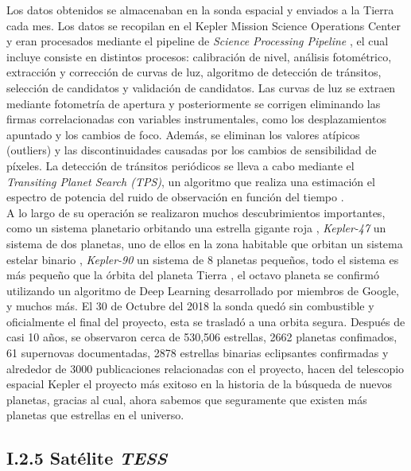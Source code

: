 Los datos obtenidos se almacenaban en la sonda espacial y enviados a la Tierra cada mes. Los datos se recopilan en el Kepler Mission Science Operations Center y eran procesados mediante el pipeline de \textit{Science Processing Pipeline} \cite{jenkins2010overview}, el cual incluye consiste en distintos procesos: calibración de nivel, análisis fotométrico, extracción y corrección de curvas de luz, algoritmo de detección de tránsitos, selección de candidatos y validación de candidatos. Las curvas de luz se extraen mediante fotometría de apertura y posteriormente se corrigen eliminando las firmas correlacionadas con variables instrumentales, como los desplazamientos apuntado y los cambios de foco.
Además, se eliminan los valores atípicos (outliers) y las discontinuidades causadas por los cambios de sensibilidad de píxeles. La detección de tránsitos periódicos se lleva a cabo mediante el \textit{Transiting Planet Search (TPS)}, un algoritmo que realiza una estimación el espectro de potencia del ruido de observación en función del tiempo \cite{jenkins2010transiting}.\\

A lo largo de su operación se realizaron muchos descubrimientos importantes, como un sistema planetario orbitando una estrella gigante roja \cite{charpinet2011compact}, \textit{Kepler-47} un sistema de dos planetas, uno de ellos en la zona habitable que orbitan un sistema estelar binario \cite{orosz2012kepler}, \textit{Kepler-90} un sistema de 8 planetas pequeños, todo el sistema es más pequeño que la órbita del planeta Tierra \cite{shallue2018identifying}, el octavo planeta se confirmó utilizando un algoritmo de Deep Learning desarrollado por miembros de Google, y muchos más. El 30 de Octubre del 2018 la sonda quedó sin combustible y oficialmente el final del proyecto, esta se trasladó a una orbita segura. Después
de casi 10 años, se observaron cerca de 530,506 estrellas, 2662 planetas confimados, 61 supernovas documentadas, 2878 estrellas binarias eclipsantes confirmadas y alrededor de 3000 publicaciones relacionadas con el proyecto, hacen del telescopio espacial Kepler el proyecto más exitoso en la historia de la búsqueda de nuevos planetas, gracias al cual, ahora sabemos que seguramente que existen más planetas que estrellas en el universo.\\

\subsection*{I.2.5 Satélite \textit{TESS}}

